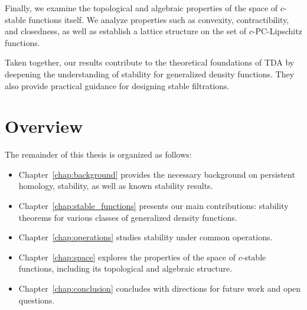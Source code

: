 Finally, we examine the topological and algebraic properties of the space of
$c$-stable functions itself. We analyze properties such as convexity,
contractibility, and closedness, as well as establish a lattice structure on the
set of $c$-PC-Lipschitz functions.

Taken together, our results contribute to the theoretical foundations of TDA by
deepening the understanding of stability for generalized density functions. They
also provide practical guidance for designing stable filtrations.

\section{Overview}

The remainder of this thesis is organized as follows:
\begin{itemize}
    \item Chapter~\ref{chap:background} provides the necessary background on
        persistent homology, stability, as well as known stability results.
    \item Chapter~\ref{chap:stable_functions} presents our main contributions:
        stability theorems for various classes of generalized density functions.
    \item Chapter~\ref{chap:operations} studies stability under common
        operations.
    \item Chapter~\ref{chap:space} explores the properties of the space of
        $c$-stable functions, including its topological and algebraic
        structure.
    \item Chapter~\ref{chap:conclusion} concludes with directions for future
        work and open questions.
\end{itemize}
